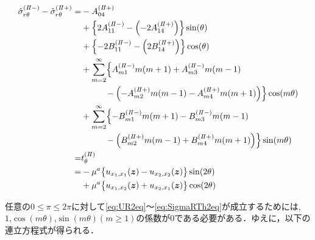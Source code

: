 \begin{align}
	\hat{\sigma}_{r\theta}^{(I\hspace{-.15em}I-)}-\hat{\sigma}_{r\theta}^{(I\hspace{-.15em}I+)} =
	&-A_{04}^{(I\hspace{-.15em}I+)}
	\nonumber
	\\
	&+\Bigl\{2A_{11}^{(I\hspace{-.15em}I-)}
	-\Bigl(-2A_{14}^{(I\hspace{-.15em}I+)}\Bigr)\Bigr\}\sin(\theta)
	\nonumber
	\\
	&+\Bigl\{-2B_{11}^{(I\hspace{-.15em}I-)}
	-\Bigl(2B_{14}^{(I\hspace{-.15em}I+)}\Bigr)\Bigr\}\cos(\theta)
	\nonumber
	\\
	&+\sum_{m=2}^{\infty}\Bigl\{
 	A_{m1}^{(I\hspace{-.15em}I-)}m(m+1)+A_{m3}^{(I\hspace{-.15em}I-)}m(m-1)
	\nonumber
	\\
	&\hspace{1.0cm}-\Bigl(-A_{m2}^{(I\hspace{-.15em}I+)}m(m-1)-A_{m4}^{(I\hspace{-.15em}I+)}m(m+1)\Bigr)
	\Bigr\}\cos(m\theta)
	\nonumber
	\\
	&+\sum_{m=2}^{\infty}\Bigl\{
	-B_{m1}^{(I\hspace{-.15em}I-)}m(m+1)-B_{m3}^{(I\hspace{-.15em}I-)}m(m-1)
	\nonumber
	\\
	&\hspace{1.0cm}-\Bigl(B_{m2}^{(I\hspace{-.15em}I+)}m(m-1)+B_{m4}^{(I\hspace{-.15em}I+)}m(m+1)\Bigr)
	\Bigr\}\sin(m\theta)
	\nonumber
	\\
	=&t_{\theta}^{(I\hspace{-.15em}I)}
	\nonumber
	\\
		=&-\mu^a \bigl\{u_{x_{1},x_{1}}(\bm{z})-u_{x_{2},x_{2}}(\bm{z})\bigr\}\sin(2\theta)
			\nonumber
			\\
			&+\mu^a \bigl\{u_{x_{1},x_{2}}(\bm{z})+u_{x_{2},x_{1}}(\bm{z})\bigr\}\cos(2\theta)
	\label{eq:SigmaRTh2eq}
\end{align}

任意の$0\leq\pi\leq2\pi$に対して\eqref{eq:UR2eq}～\eqref{eq:SigmaRTh2eq}が成立するためには,\\
$1$,$\cos(m\theta)$,$\sin(m\theta)$$(m\geq1)$の係数が0である必要がある．ゆえに，以下の連立方程式が得られる．

